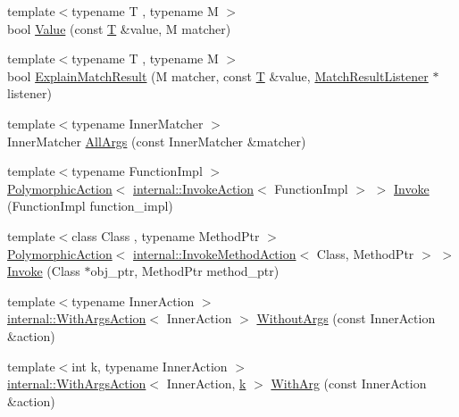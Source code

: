 \begin{DoxyCompactItemize}
{\footnotesize template$<$typename T , typename M $>$ }\\bool \hyperlink{namespacetesting_ae44c50a3a7f0a46f05c8a0b0592b4a62}{Value} (const \hyperlink{functions__7_8js_adf1f3edb9115acb0a1e04209b7a9937b}{T} \&value, M matcher)
\item 
{\footnotesize template$<$typename T , typename M $>$ }\\bool \hyperlink{namespacetesting_a6d5fbd5104dafc63bf705dafbcb5ce18}{Explain\+Match\+Result} (M matcher, const \hyperlink{functions__7_8js_adf1f3edb9115acb0a1e04209b7a9937b}{T} \&value, \hyperlink{classtesting_1_1_match_result_listener}{Match\+Result\+Listener} $\ast$listener)
\item 
{\footnotesize template$<$typename Inner\+Matcher $>$ }\\Inner\+Matcher \hyperlink{namespacetesting_a2522e94b71f88fbfbbcf6942cd0c6ee0}{All\+Args} (const Inner\+Matcher \&matcher)
\item 
{\footnotesize template$<$typename Function\+Impl $>$ }\\\hyperlink{classtesting_1_1_polymorphic_action}{Polymorphic\+Action}$<$ \hyperlink{classtesting_1_1internal_1_1_invoke_action}{internal\+::\+Invoke\+Action}$<$ Function\+Impl $>$ $>$ \hyperlink{namespacetesting_a12aebaf8363d49a383047529f798b694}{Invoke} (Function\+Impl function\+\_\+impl)
\item 
{\footnotesize template$<$class Class , typename Method\+Ptr $>$ }\\\hyperlink{classtesting_1_1_polymorphic_action}{Polymorphic\+Action}$<$ \hyperlink{classtesting_1_1internal_1_1_invoke_method_action}{internal\+::\+Invoke\+Method\+Action}$<$ Class, Method\+Ptr $>$ $>$ \hyperlink{namespacetesting_a80b82dc382445d240ff011f9c34aefc4}{Invoke} (Class $\ast$obj\+\_\+ptr, Method\+Ptr method\+\_\+ptr)
\item 
{\footnotesize template$<$typename Inner\+Action $>$ }\\\hyperlink{classtesting_1_1internal_1_1_with_args_action}{internal\+::\+With\+Args\+Action}$<$ Inner\+Action $>$ \hyperlink{namespacetesting_aeac85f74bd11112f69142e92e3a50780}{Without\+Args} (const Inner\+Action \&action)
\item 
{\footnotesize template$<$int k, typename Inner\+Action $>$ }\\\hyperlink{classtesting_1_1internal_1_1_with_args_action}{internal\+::\+With\+Args\+Action}$<$ Inner\+Action, \hyperlink{jquery_8js_ab26645c014aa005ecedef329ecf58c99}{k} $>$ \hyperlink{namespacetesting_af76590c6cecc621e1ab4b681a9ea209b}{With\+Arg} (const Inner\+Action \&action)

\end{DoxyCompactItemize}
